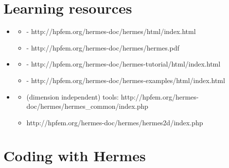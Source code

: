 \documentclass{beamer}
\begin{document}
\section{Learning resources}
\begin{frame}
	\begin{itemize}
		\item {}
			\begin{itemize}
				\item {} - http://hpfem.org/hermes-doc/hermes/html/index.html
				\item {} - http://hpfem.org/hermes-doc/hermes/hermes.pdf
			\end{itemize}
		\item {}
			\begin{itemize}
				\item {} - http://hpfem.org/hermes-doc/hermes-tutorial/html/index.html
				\item {} - http://hpfem.org/hermes-doc/hermes-examples/html/index.html
			\end{itemize}
		\item {}
			\begin{itemize}
				\item {} (dimension independent) tools: http://hpfem.org/hermes-doc/hermes/hermes\_common/index.php
				\item {} http://hpfem.org/hermes-doc/hermes/hermes2d/index.php
			\end{itemize}
	\end{itemize}
\end{frame}


\section{Coding with Hermes}
\end{document}
